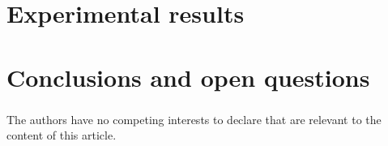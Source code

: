 \documentclass{llncs}
\begin{document}
\section{Experimental results}



\section{Conclusions and open questions}



\begin{credits}

\subsubsection{\discintname}The authors have no competing interests to declare that are
relevant to the content of this article.
\end{credits}
%
%
\printbibliography
\end{document}
